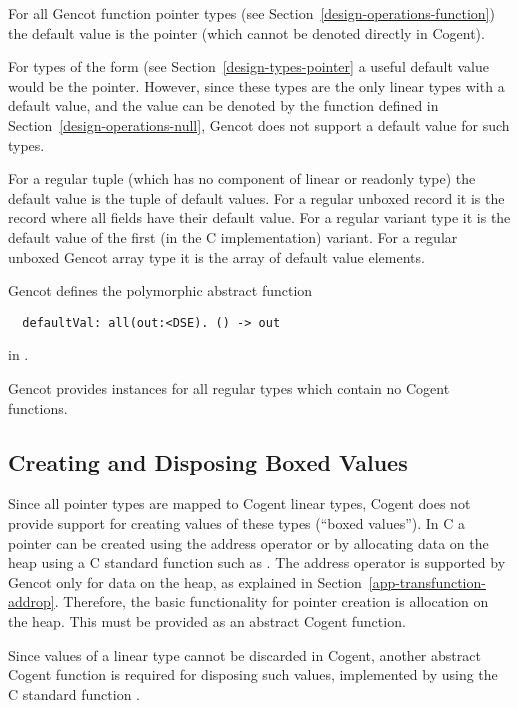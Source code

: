 For all Gencot function pointer types (see Section~\ref{design-operations-function}) the default value is the 
pointer (which cannot be denoted directly in Cogent).

For types of the form  (see Section~\ref{design-types-pointer} a useful default value would be the 
 pointer. However, since these types are the only linear types with a default value, and the  value
can be denoted by the function  defined in Section~\ref{design-operations-null}, Gencot does not support
a default value for such types.

For a regular tuple (which has no component of linear or readonly type) the default value is the tuple of default values. For a
regular unboxed record it is the record where all fields have their default value. For a regular variant type it is
the default value of the first (in the C implementation) variant. For a regular unboxed Gencot array type it is the 
array of default value elements.

Gencot defines the polymorphic abstract function
\begin{verbatim}
  defaultVal: all(out:<DSE). () -> out
\end{verbatim}
in . 

Gencot provides instances for all regular types which contain no Cogent functions.

\subsection{Creating and Disposing Boxed Values}
\label{design-operations-create}

Since all pointer types are mapped to Cogent linear types, Cogent does not provide support for creating values
of these types (``boxed values''). In C a pointer can be created using the address operator \code{\&} or by allocating data on
the heap using a C standard function such as . The address operator is supported by Gencot
only for data on the heap, as explained in Section~\ref{app-transfunction-addrop}. Therefore, the basic functionality
for pointer creation is allocation on the heap. This must be provided as an abstract Cogent function.

Since values of a linear type cannot be discarded in Cogent, another abstract Cogent function is required for
disposing such values, implemented by using the C standard function .

